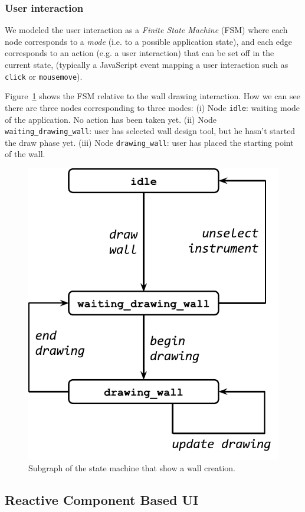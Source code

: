 \subsubsection*{User interaction} We modeled the user interaction as a \emph{Finite State Machine} (FSM) where each node corresponds to a \emph{mode} (i.e. to a possible application state), and each edge corresponds to an action (e.g. a user interaction) that can be set off in the current state, (typically a JavaScript event mapping a user interaction such as \texttt{click} or \texttt{mousemove}). 

Figure~\ref{fig_uc_draw_wall} shows the FSM relative to the wall drawing interaction. How we can see there are three nodes corresponding to three modes: (i) Node \texttt{idle}: waiting mode of the application. No action has been taken yet. (ii) Node \texttt{waiting\_drawing\_wall}: user has selected wall design tool, but he hasn't started the draw phase yet. (iii) Node \texttt{drawing\_wall}: user has placed the starting point of the wall.


\begin{figure}[!t]
\centering
\includegraphics[width=0.6\linewidth]{contents/images/uc_draw_wall}

\caption{Subgraph of the state machine that show a wall creation.}
\label{fig_uc_draw_wall}
\end{figure}



\subsection{Reactive Component Based UI}


